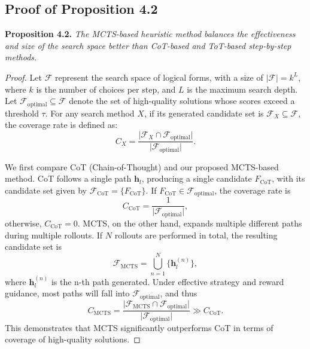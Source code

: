 \documentclass{article}
\theoremstyle{plain}
\theoremstyle{definition}
\theoremstyle{remark}
\begin{document}
\subsection{Proof of Proposition 4.2}
\label{proof2}
\textbf{Proposition 4.2.}
\textit{The MCTS-based heuristic method balances the effectiveness and size of the search space better than CoT-based and ToT-based step-by-step methods.}
\begin{proof} 
Let $\mathcal{F}$ represent the search space of logical forms, with a size of $\lvert \mathcal{F} \rvert = k^L$, where $k$ is the number of choices per step, and $L$ is the maximum search depth. Let $\mathcal{F}_{\text{optimal}} \subseteq \mathcal{F}$ denote the set of high-quality solutions whose scores exceed a threshold $\tau$. For any search method $X$, if its generated candidate set is $\mathcal{F}_X \subseteq \mathcal{F}$, the coverage rate is defined as:
\begin{equation}
C_X = \frac{\lvert \mathcal{F}_X \cap \mathcal{F}_{\text{optimal}} \rvert}{\lvert \mathcal{F}_{\text{optimal}} \rvert}.
\end{equation}

We first compare CoT (Chain-of-Thought) and our proposed MCTS-based method. CoT follows a single path $\mathbf{h}_l$, producing a single candidate $F_{\text{CoT}}$, with its candidate set given by $\mathcal{F}_{\text{CoT}} = \{ F_{\text{CoT}} \}$. If $F_{\text{CoT}} \in \mathcal{F}_{\text{optimal}}$, the coverage rate is
\begin{equation}
C_{\text{CoT}} = \frac{1}{\lvert \mathcal{F}_{\text{optimal}} \rvert},
\end{equation}
otherwise, $C_{\text{CoT}} = 0$.
MCTS, on the other hand, expands multiple different paths during multiple rollouts. If $N$ rollouts are performed in total, the resulting candidate set is
\begin{equation}
\mathcal{F}_{\text{MCTS}} = \bigcup_{n=1}^N \{ \mathbf{h}_l^{(n)} \},
\end{equation}
where $\mathbf{h}_l^{(n)}$ is the n-th path generated. Under effective strategy and reward guidance, most paths will fall into $\mathcal{F}_{\text{optimal}}$, and thus
\begin{equation}
C_{\text{MCTS}} = \frac{\lvert \mathcal{F}_{\text{MCTS}} \cap \mathcal{F}_{\text{optimal}} \rvert}{\lvert \mathcal{F}_{\text{optimal}} \rvert} \gg C_{\text{CoT}}.
\end{equation}
This demonstrates that MCTS significantly outperforms CoT in terms of coverage of high-quality solutions.


\end{proof}
\end{document}
